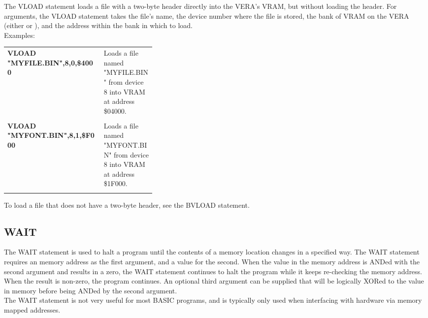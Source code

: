 The {\ttfamily VLOAD} statement loads a file with a two-byte header directly
into the VERA's VRAM, but without loading the header.  For arguments, the
{\ttfamily VLOAD} statement takes the file's name, the device number where the
file is stored, the bank of VRAM on the VERA (either {} or
{}), and the address within the bank in which to load.\\

Examples:\\

\begin{tabular}{l p{0.35\linewidth}}

	{\ttfamily\bfseries VLOAD "MYFILE.BIN",8,0,\$4000}&Loads a file named
	"MYFILE.BIN" from device 8 into VRAM at address \$04000.\\\\

	{\ttfamily\bfseries VLOAD "MYFONT.BIN",8,1,\$F000}&Loads a file named
	"MYFONT.BIN" from device 8 into VRAM at address \$1F000.\\\\

\end{tabular}

To load a file that does not have a two-byte header, see the {\ttfamily BVLOAD}
statement.\\

\subsection{WAIT}

The {\ttfamily WAIT} statement is used to halt a program until the contents of
a memory location changes in a specified way.  The {\ttfamily WAIT} statement
requires an memory address as the first argument, and a value for the second.
When the value in the memory address is {\ttfamily AND}ed with the second
argument and results in a zero, the {\ttfamily WAIT} statement continues to
halt the program while it keeps re-checking the memory address.  When the
result is non-zero, the program continues.  An optional third argument can be
supplied that will be logically {\ttfamily XOR}ed to the value in memory before
being {\ttfamily AND}ed by the second argument.\\

The {\ttfamily WAIT} statement is not very useful for most BASIC programs, and
is typically only used when interfacing with hardware via memory mapped
addresses.\\

